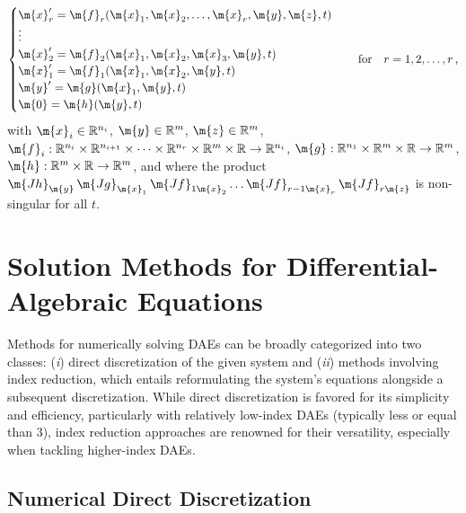 \begin{itemize}
\begin{equation*}
    \begin{cases}
      \m{x}_r^\prime = \m{f}_r(\m{x}_1, \m{x}_2, \dots, \m{x}_r, \m{y}, \m{z}, t) \\
      \vdots \\
      \m{x}_2^\prime = \m{f}_2(\m{x}_1, \m{x}_2, \m{x}_3, \m{y}, t) \\
      \m{x}_1^\prime = \m{f}_1(\m{x}_1, \m{x}_2, \m{y}, t) \\
      \m{y}^\prime = \m{g}(\m{x}_1, \m{y}, t) \\
      \m{0}        = \m{h}(\m{y}, t)
    \end{cases} \quad \text{for} \quad r = 1, 2, \dots, r \, \text{,}
  \end{equation*}
  with $\m{x}_i \in \mathbb{R}^{n_i}$, $\m{y} \in \mathbb{R}^m$, $\m{z} \in \mathbb{R}^m$, $\m{f}_i: \mathbb{R}^{n_i} \times \mathbb{R}^{n_{i+1}} \times \dots \times \mathbb{R}^{n_r} \times \mathbb{R}^{m} \times \mathbb{R} \rightarrow \mathbb{R}^{n_i}$, $\m{g}: \mathbb{R}^{n_1} \times \mathbb{R}^{m} \times \mathbb{R} \rightarrow \mathbb{R}^{m}$, $\m{h}: \mathbb{R}^{m} \times \mathbb{R} \rightarrow \mathbb{R}^{m}$, and where the product $\m{Jh}_{\m{y}} \, \m{Jg}_{\m{x}_1} \, \m{Jf}_{1\m{x}_2} \dots \m{Jf}_{r-1\m{x}_r} \, \m{Jf}_{r\m{z}}$ is non-singular for all $t$.
\end{itemize}


\section{Solution Methods for Differential-Algebraic Equations}

Methods for numerically solving \acp{DAE} can be broadly categorized into two classes: (\emph{i}) direct discretization of the given system and (\emph{ii}) methods involving index reduction, which entails reformulating the system's equations alongside a subsequent discretization. While direct discretization is favored for its simplicity and efficiency, particularly with relatively low-index \acp{DAE} (typically less or equal than 3), index reduction approaches are renowned for their versatility, especially when tackling higher-index \acp{DAE}.

\subsection{Numerical Direct Discretization}

